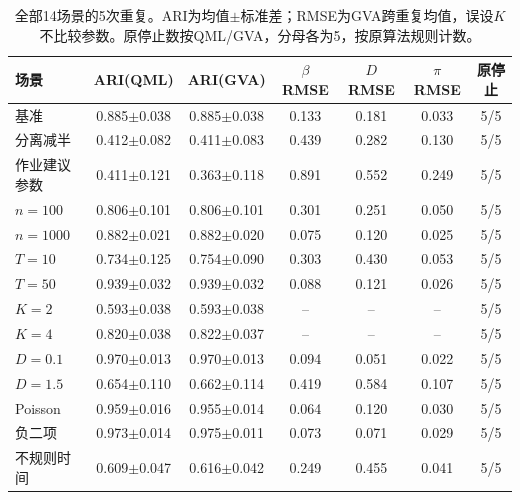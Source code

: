 \begin{table}[H]\centering\small
\caption{全部14场景的5次重复。ARI为均值$\pm$标准差；RMSE为GVA跨重复均值，误设$K$不比较参数。原停止数按QML/GVA，分母各为5，按原算法规则计数。}
\begin{tabular}{lcccccc}\toprule
场景 & ARI(QML) & ARI(GVA) & $\beta$ RMSE & $D$ RMSE & $\pi$ RMSE & 原停止\\\midrule
基准 & 0.885$\pm$0.038 & 0.885$\pm$0.038 & 0.133 & 0.181 & 0.033 & 5/5 \\
分离减半 & 0.412$\pm$0.082 & 0.411$\pm$0.083 & 0.439 & 0.282 & 0.130 & 5/5 \\
作业建议参数 & 0.411$\pm$0.121 & 0.363$\pm$0.118 & 0.891 & 0.552 & 0.249 & 5/5 \\
$n=100$ & 0.806$\pm$0.101 & 0.806$\pm$0.101 & 0.301 & 0.251 & 0.050 & 5/5 \\
$n=1000$ & 0.882$\pm$0.021 & 0.882$\pm$0.020 & 0.075 & 0.120 & 0.025 & 5/5 \\
$T=10$ & 0.734$\pm$0.125 & 0.754$\pm$0.090 & 0.303 & 0.430 & 0.053 & 5/5 \\
$T=50$ & 0.939$\pm$0.032 & 0.939$\pm$0.032 & 0.088 & 0.121 & 0.026 & 5/5 \\
$K=2$ & 0.593$\pm$0.038 & 0.593$\pm$0.038 & -- & -- & -- & 5/5 \\
$K=4$ & 0.820$\pm$0.038 & 0.822$\pm$0.037 & -- & -- & -- & 5/5 \\
$D=0.1$ & 0.970$\pm$0.013 & 0.970$\pm$0.013 & 0.094 & 0.051 & 0.022 & 5/5 \\
$D=1.5$ & 0.654$\pm$0.110 & 0.662$\pm$0.114 & 0.419 & 0.584 & 0.107 & 5/5 \\
Poisson & 0.959$\pm$0.016 & 0.955$\pm$0.014 & 0.064 & 0.120 & 0.030 & 5/5 \\
负二项 & 0.973$\pm$0.014 & 0.975$\pm$0.011 & 0.073 & 0.071 & 0.029 & 5/5 \\
不规则时间 & 0.609$\pm$0.047 & 0.616$\pm$0.042 & 0.249 & 0.455 & 0.041 & 5/5 \\
\bottomrule\end{tabular}\end{table}
